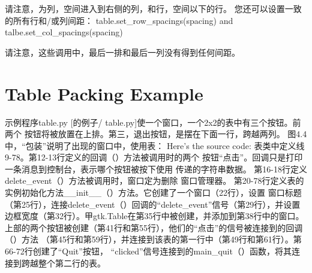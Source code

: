 请注意，为列，空间进入到右侧的列，和行，空间以下的行。
您还可以设置一致的所有行和/或列间距：
table.set_row_spacings(spacing)
and
talbe.set_col_spacings(spacing)

请注意，这些调用中，最后一排和最后一列没有得到任何间距。
\section{Table Packing Example}
示例程序table.py [的例子/ table.py]使一个窗口，一个2x2的表中有三个按钮。前两个
按钮将被放置在上排。第三，退出按钮，是摆在下面一行，跨越两列。
图4.4中，“包装”说明了出现的窗口中，使用表：	
Here's the source code:
表类中定义线9-78。第12-13行定义的回调（）方法被调用时的两个
按钮“点击”。回调只是打印一条消息到控制台，表示哪个按钮被按下使用
传递的字符串数据。
第16-18行定义delete_event（）方法被调用时，窗口定为删除
窗口管理器。
第20-78行定义表的实例初始化方法__init__（）方法。它创建了一个窗口（22行），设置
窗口标题（第25行），连接delete_event（）回调的“delete_event”信号（第29行），并设置
边框宽度（第32行）。甲gtk.Table在第35行中被创建，并添加到第38行中的窗口。
上部的两个按钮被创建（第41行和第55行），他们的“点击”的信号被连接到的回调（）方法
（第45行和第59行），并连接到该表的第一行中（第49行和第61行）。第66-72行创建了“Quit”按钮，
“clicked”信号连接到的main_quit（）函数，将其连接到跨越整个第二行的表。	

